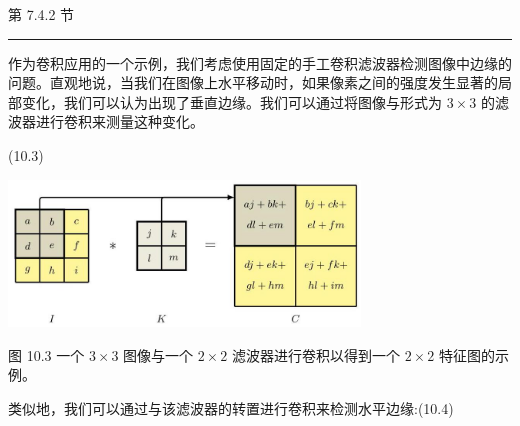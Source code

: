 \documentclass[10pt]{report}
\newcommand{\HRule}{\begin{center}\rule{0.9\linewidth}{0.2mm}\end{center}}
\begin{document}
第 7.4.2 节

\HRule

作为卷积应用的一个示例，我们考虑使用固定的手工卷积滤波器检测图像中边缘的问题。直观地说，当我们在图像上水平移动时，如果像素之间的强度发生显著的局部变化，我们可以认为出现了垂直边缘。我们可以通过将图像与形式为 \(3 \times  3\) 的滤波器进行卷积来测量这种变化。

\begin{center}
\end{center}

(10.3)

\begin{center}
\includegraphics[max width=0.7\textwidth]{images/0194e279-9b28-703a-88f4-c3ac21e2010d_312_543_346_918_384_0.jpg}
\end{center}
\hspace*{3em} 

图 10.3 一个 \(3 \times  3\) 图像与一个 \(2 \times  2\) 滤波器进行卷积以得到一个 \(2 \times  2\) 特征图的示例。

类似地，我们可以通过与该滤波器的转置进行卷积来检测水平边缘:(10.4)

\begin{center}
\end{center}
\end{document}
